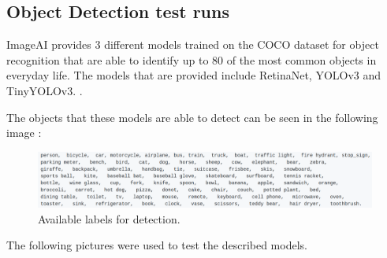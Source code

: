 
  \subsection{Object Detection test runs}
  \label{sec:object_test}

  \par ImageAI provides 3 different models trained on the COCO dataset for object recognition that are able to identify up to 80 of the most common objects in everyday life. The models that are provided include RetinaNet, YOLOv3 and TinyYOLOv3. \cite{ImageAI}.


  The objects that these models are able to detect can be seen in the following image : 





    \begin{figure}[htb]
      \centering
      \includegraphics[width = \textwidth]{Sections/4InitialWork/4_images_random/detections.png}
      \caption{Available labels for detection. }
      \label{fig:yolov3} 
  \end{figure}


The following pictures were used to test the described models.


